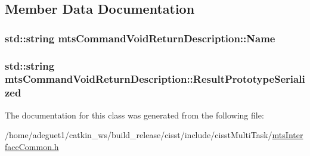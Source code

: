 \subsection{Member Data Documentation}
\hypertarget{classmts_command_void_return_description_aa258d6d3495e9d4513d1071edff40cb0}{
\subsubsection[{Name}]{\setlength{\rightskip}{0pt plus 5cm}std\-::string mts\-Command\-Void\-Return\-Description\-::\-Name}}\label{classmts_command_void_return_description_aa258d6d3495e9d4513d1071edff40cb0}
\hypertarget{classmts_command_void_return_description_a60bda95fadbacc5d14b9906d09412a0a}{
\subsubsection[{Result\-Prototype\-Serialized}]{\setlength{\rightskip}{0pt plus 5cm}std\-::string mts\-Command\-Void\-Return\-Description\-::\-Result\-Prototype\-Serialized}}\label{classmts_command_void_return_description_a60bda95fadbacc5d14b9906d09412a0a}


The documentation for this class was generated from the following file\-:\begin{DoxyCompactItemize}
\item 
/home/adeguet1/catkin\-\_\-ws/build\-\_\-release/cisst/include/cisst\-Multi\-Task/\hyperlink{mts_interface_common_8h}{mts\-Interface\-Common.\-h}\end{DoxyCompactItemize}
